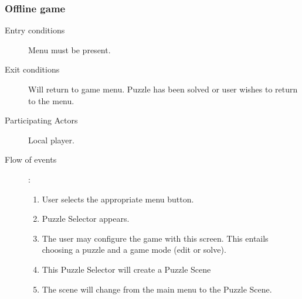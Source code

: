 \documentclass[12pt]{article}
\begin{document}
\begin{mdframed}
    \subsubsection{Offline game}
    \begin{description}
        \item[Entry conditions] Menu must be present.
        \item[Exit conditions] Will return to game menu. Puzzle has been
            solved or user wishes to return to the menu.
        \item[Participating Actors] Local player.
        \item[Flow of events]:
            \begin{enumerate}
                \item User selects the appropriate menu button.
                \item Puzzle Selector appears.
                \item The user may configure the game with this screen. This
                    entails choosing a puzzle and a game mode (edit or solve).
                \item This Puzzle Selector will create a Puzzle Scene
                \item The scene will change from the main menu to the Puzzle
                    Scene.
            \end{enumerate}
    \end{description}
\end{mdframed}
\end{document}
